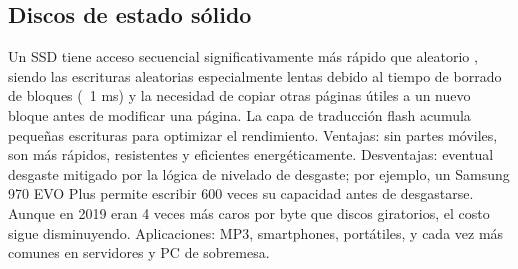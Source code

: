 \subsection{Discos de estado sólido}
Un SSD tiene acceso secuencial significativamente más rápido que aleatorio
, siendo las escrituras aleatorias especialmente lentas debido al tiempo 
de borrado de bloques (~1 ms) y la 
necesidad de copiar otras páginas útiles a un nuevo bloque 
antes de modificar una página. La capa de traducción flash acumula pequeñas escrituras para optimizar el rendimiento. Ventajas: sin partes móviles, son más rápidos, resistentes y eficientes energéticamente. Desventajas: eventual desgaste mitigado por la lógica de nivelado de desgaste; por ejemplo, un Samsung 970 EVO Plus permite escribir 600 veces su capacidad antes de desgastarse. Aunque en 2019 eran 4 veces más caros por byte que discos giratorios, el costo sigue disminuyendo. Aplicaciones: MP3, smartphones, portátiles, y cada vez más comunes en servidores y PC de sobremesa.


